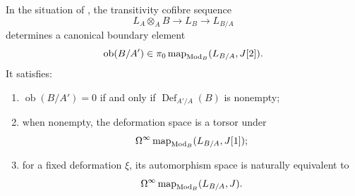 \begin{theorem}
\label{thm:affine-cotangent-obstruction}
In the situation of
, the transitivity cofibre sequence
\[
    L_A\otimes_AB
    \longrightarrow
    L_B
    \longrightarrow
    L_{B/A}
\]
determines a canonical boundary element
\[
    \operatorname{ob}(B/A')
    \in
    \pi_0\operatorname{map}_{\operatorname{Mod}_B}(L_{B/A},J[2]).
\]
It satisfies:
\begin{enumerate}[label=(\roman*)]
    \item \(\operatorname{ob}(B/A')=0\) if and only if
    \(\operatorname{Def}_{A'/A}(B)\) is nonempty;
    \item when nonempty, the deformation space is a torsor under
    \[
        \Omega^\infty\operatorname{map}_{\operatorname{Mod}_B}(L_{B/A},J[1]);
    \]
    \item for a fixed deformation \(\xi\), its automorphism space is naturally
    equivalent to
    \[
        \Omega^\infty\operatorname{map}_{\operatorname{Mod}_B}(L_{B/A},J).
    \]
\end{enumerate}
\end{theorem}

